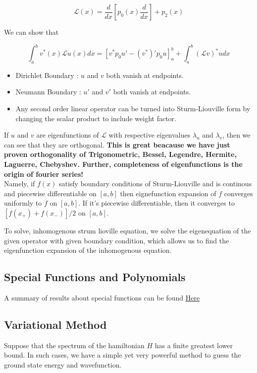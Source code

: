 \documentclass{report}
\begin{document}
$$\mathcal{L}(x) = \frac{d}{dx}\left[p_0(x)\frac{d}{dx}\right]+p_2(x)$$

\noindent We can show that

$$\int_{a}^{b}v^*(x)\mathcal{L}u(x)dx = \left[v^* p_0 u' - (v^*)'p_0 u\right]_{a}^{b} + \int_{a}^{b}(\mathcal{L}v)^* u dx$$

\begin{itemize}
  \item Dirichlet Boundary : $u$ and $v$ both vanish at endpoints.
  \item Neumann Boundary : $u'$ and $v'$ both vanish at endpoints.
  \item Any second order linear operator can be turned into Sturm-Liouville form by changing the scalar product to include weight factor.
\end{itemize}

\noindent If $u$ and $v$ are eigenfunctions of $\mathcal{L}$ with respective eigenvalues $\lambda_u$ and $\lambda_v$, then we can see that they are orthogonal. \textbf{This is great beacause we have just proven orthogonality of Trigonometric, Bessel, Legendre, Hermite, Laguerre, Chebyshev. Further, completeness of eigenfunctions is the origin of fourier series!}\\

\noindent Namely, if $f(x)$ satisfy boundary conditions of Sturm-Liouville and is continous and piecewise differentiable on $[a,b]$ then eignefunction expansion of $f$ converges uniformly to $f$ on $[a,b]$. If it's piecewise differentiable, then it converges to $[f(x_+) + f(x_-)]/2$ on $[a,b]$.

\noindent To solve, inhomogenous strum lioville equation, we solve the eigenequation of the given operator with given boundary condition, which allows us to find the eigenfunction expansion of the inhomogenous equation.

\subsection{Special Functions and Polynomials}

A summary of results about special functions can be found \href{https://webspace.science.uu.nl/~hooft101/lectures/specialfct.pdf}{Here}

\subsection{Variational Method}
Suppose that the spectrum of the hamiltonian $H$ has a finite greatest lower bound. In such cases, we have a simple yet very powerful method to guess the ground state energy and wavefunction.
\end{document}
